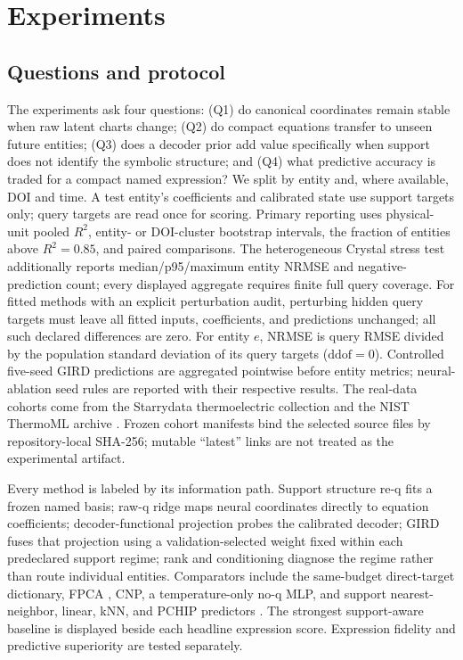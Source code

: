\section{Experiments}
\label{sec:experiments}

\subsection{Questions and protocol}

The experiments ask four questions: (Q1) do canonical coordinates remain stable
when raw latent charts change; (Q2) do compact equations transfer to unseen
future entities; (Q3) does a decoder prior add value specifically when support
does not identify the symbolic structure; and (Q4) what predictive accuracy is
traded for a compact named expression?  We split by entity and, where available,
DOI and time.  A test entity's coefficients and calibrated state use support
targets only; query targets are read once for scoring.  Primary reporting uses
physical-unit pooled $R^2$, entity- or DOI-cluster bootstrap intervals, the
fraction of entities above $R^2=0.85$, and paired comparisons.  The heterogeneous
Crystal stress test additionally reports median/p95/maximum entity NRMSE and
negative-prediction count; every displayed aggregate requires finite full query
coverage.  For fitted methods with an explicit perturbation audit, perturbing
hidden query targets must leave all fitted inputs, coefficients, and predictions
unchanged; all such declared differences are zero.
For entity $e$, NRMSE is query RMSE divided by the population standard deviation
of its query targets ($\mathrm{ddof}=0$).  Controlled five-seed GIRD predictions
are aggregated pointwise before entity metrics; neural-ablation seed rules are
reported with their respective results.
The real-data cohorts come from the Starrydata thermoelectric collection
\citep{katsura2025starrydata} and the NIST ThermoML archive
\citep{riccardi2021thermoml,frenkel2006thermoml}.  Frozen cohort manifests bind
the selected source files by repository-local SHA-256; mutable ``latest'' links
are not treated as the experimental artifact.

Every method is labeled by its information path.  Support structure re-q fits a
frozen named basis; raw-q ridge maps neural coordinates directly to equation
coefficients; decoder-functional projection probes the calibrated decoder;
GIRD fuses that projection using a validation-selected weight fixed within each
predeclared support regime; rank and conditioning diagnose the regime rather
than route individual entities.  Comparators include
the same-budget direct-target dictionary, FPCA \citep{ramsay2005functional},
CNP, a temperature-only no-q MLP, and support nearest-neighbor, linear, kNN,
and PCHIP predictors \citep{fritsch1984pchip}.  The
strongest support-aware baseline is displayed beside each headline expression
score.  Expression fidelity and predictive superiority are tested separately.

